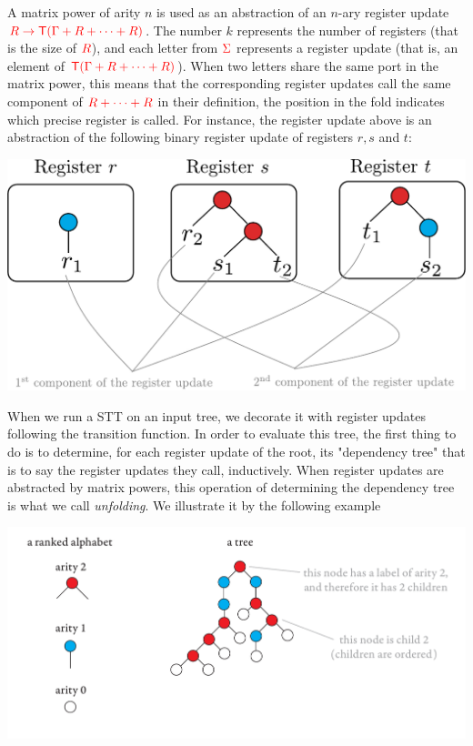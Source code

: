A matrix power of arity $n$ is used as an abstraction of an $n$-ary register update ${\color{red}{R\to {\color{red}{\mathsf T}}(\Gamma+R+\dots+R)}}$. The number $k$ represents the number of registers (that is the size of ${\color{red}{R}}$), and each letter from ${\color{red}{\Sigma}}$ represents a register update (that is, an element of ${\color{red}{{\color{red}{\mathsf T}}(\Gamma+R+\dots+R)}}$). When two letters share the same port in the matrix power, this means that the corresponding register updates call the same component of ${\color{red}{R+\dots+R}}$ in their definition, the position in the fold indicates which precise register is called. For instance, the register update above is an abstraction of the following binary register update of registers $r, s$ and $t$:
   \begin{center}
   \includegraphics[scale=.3]{register-update-matrix-power.pdf}
   \end{center}
When we run a STT on an input tree, we decorate it with register updates following the transition function. In order to evaluate this tree, the first thing to do is to determine, for each register update of the root, its "dependency tree" that is to say the register updates they call, inductively. When register updates are abstracted by matrix powers, this operation of determining the dependency tree is what we call \emph{unfolding}. We illustrate it by the following example 
\begin{center}
\includegraphics[scale=.28, page=39]{pics.pdf}
\end{center}
